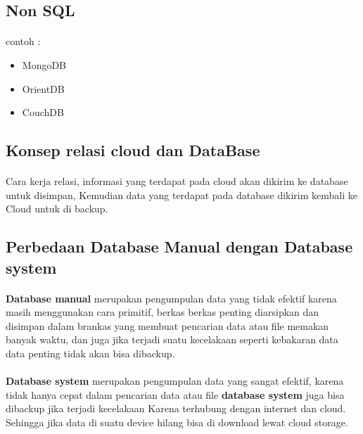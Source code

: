\documentclass[a4paper]{article}
\begin{document}
\subsection*{Non SQL}
\paragraph{}
contoh :
	\begin{itemize}
	\item MongoDB
	\item OrientDB
	\item CouchDB
\end{itemize}

	\subsection{Konsep relasi cloud  dan DataBase}
	\paragraph{}
	Cara kerja relasi, informasi yang terdapat pada cloud akan dikirim ke database untuk disimpan, Kemudian data yang terdapat pada database dikirim kembali ke Cloud untuk di backup.
	
	\subsection{Perbedaan Database Manual dengan Database system}
	\paragraph{}
	\textbf{Database manual} merupakan pengumpulan data yang tidak efektif karena masih menggunakan cara primitif, berkas berkas penting diarsipkan dan disimpan dalam brankas yang membuat pencarian data atau file memakan banyak waktu, dan juga jika terjadi suatu kecelakaan seperti kebakaran data data penting tidak akan bisa dibackup.
	\paragraph{}
	\textbf{Database system} merupakan pengumpulan data yang sangat efektif, karena tidak hanya cepat dalam pencarian data atau file \textbf{database system} juga bisa dibackup jika terjadi kecelakaan Karena terhubung dengan internet dan cloud. Sehingga jika data di suatu device hilang bisa di download lewat cloud storage.
	
\end{document}
